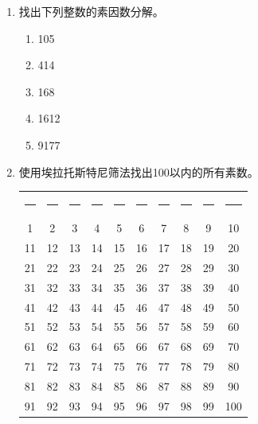 \begin{enumerate}

  \item 
  
    找出下列整数的素因数分解。
  
    \begin{enumerate}
    \item 105
    \item 414
    \item 168
    \item 1612
    \item 9177
    \end{enumerate}
  
  
  \item 
  
  使用埃拉托斯特尼筛法找出100以内的所有素数。
  
  \begin{tabular}{cccccccccc}
  \rule{14pt}{0pt} & \rule{14pt}{0pt} & \rule{14pt}{0pt} &
  \rule{14pt}{0pt} & \rule{14pt}{0pt} & \rule{14pt}{0pt} & 
  \rule{14pt}{0pt} & \rule{14pt}{0pt} & \rule{14pt}{0pt} &
  \rule{14pt}{0pt} \\
   1 & 2 & 3 & 4 & 5 & 6 & 7 & 8 & 9 & 10 \\
   11 & 12 & 13 & 14 & 15 & 16 & 17 & 18 & 19 & 20 \\
   21 & 22 & 23 & 24 & 25 & 
   26 & 27 & 28 & 29 & 30 \\
   31 & 32 & 33 & 34 & 35 & 36 & 37 & 38 & 39 & 40 \\
   41 & 42 & 43 & 44 & 45 & 46 & 47 & 48 & 49 & 50 \\
   51 & 52 & 53 & 54 & 55 & 56 & 57 & 58 & 59 & 60 \\ 
   61 & 62 & 63 & 64 & 65 & 66 & 67 & 68 & 69 & 70 \\
   71 & 72 & 73 & 74 & 75 
   & 76 & 77 & 78 & 79 & 80 \\
   81 & 82 & 83 & 84 & 85 & 86 & 87 & 88 & 89 & 90 \\
   91 & 92 & 93 & 94 & 95 & 96 & 97 & 98 & 99 & 100
  \end{tabular}
  
  

\end{enumerate}
